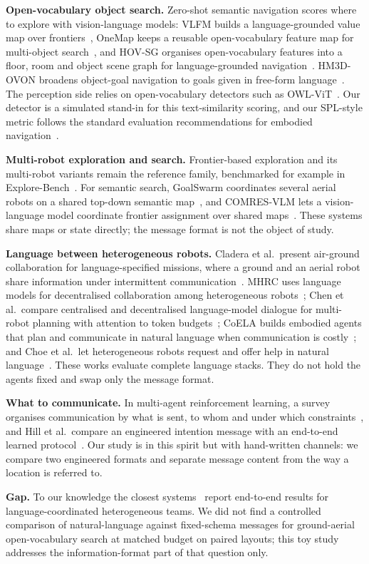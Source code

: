 \textbf{Open-vocabulary object search.} Zero-shot semantic navigation scores where to explore with vision-language models: VLFM builds a language-grounded value map over frontiers~\cite{yokoyama2023vlfm}, OneMap keeps a reusable open-vocabulary feature map for multi-object search~\cite{busch2024one}, and HOV-SG organises open-vocabulary features into a floor, room and object scene graph for language-grounded navigation~\cite{werby2024hierarchical}. HM3D-OVON broadens object-goal navigation to goals given in free-form language~\cite{yokoyama2024hm}. The perception side relies on open-vocabulary detectors such as OWL-ViT~\cite{minderer2022simple}. Our detector is a simulated stand-in for this text-similarity scoring, and our SPL-style metric follows the standard evaluation recommendations for embodied navigation~\cite{anderson2018evaluation}.

\textbf{Multi-robot exploration and search.} Frontier-based exploration and its multi-robot variants remain the reference family, benchmarked for example in Explore-Bench~\cite{xu2022explore}. For semantic search, GoalSwarm coordinates several aerial robots on a shared top-down semantic map~\cite{james2026goalswarm}, and COMRES-VLM lets a vision-language model coordinate frontier assignment over shared maps~\cite{wang2025comres}. These systems share maps or state directly; the message format is not the object of study.

\textbf{Language between heterogeneous robots.} Cladera et al.\ present air-ground collaboration for language-specified missions, where a ground and an aerial robot share information under intermittent communication~\cite{cladera2025air}. MHRC uses language models for decentralised collaboration among heterogeneous robots~\cite{yu2024mhrc}; Chen et al.\ compare centralised and decentralised language-model dialogue for multi-robot planning with attention to token budgets~\cite{chen2023scalable}; CoELA builds embodied agents that plan and communicate in natural language when communication is costly~\cite{zhang2023building}; and Choe et al.\ let heterogeneous robots request and offer help in natural language~\cite{choe2025ask}. These works evaluate complete language stacks. They do not hold the agents fixed and swap only the message format.

\textbf{What to communicate.} In multi-agent reinforcement learning, a survey organises communication by what is sent, to whom and under which constraints~\cite{zhu2022survey}, and Hill et al.\ compare an engineered intention message with an end-to-end learned protocol~\cite{hill2025communicating}. Our study is in this spirit but with hand-written channels: we compare two engineered formats and separate message content from the way a location is referred to.

\textbf{Gap.} To our knowledge the closest systems~\cite{cladera2025air,yu2024mhrc} report end-to-end results for language-coordinated heterogeneous teams. We did not find a controlled comparison of natural-language against fixed-schema messages for ground-aerial open-vocabulary search at matched budget on paired layouts; this toy study addresses the information-format part of that question only.
